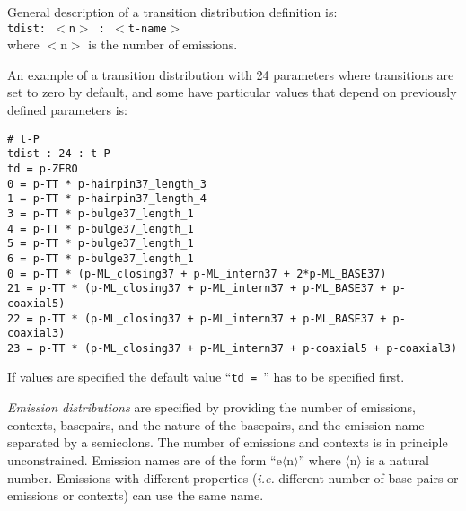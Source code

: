 \noindent
General description of a transition distribution  definition is:\\

\noindent
\texttt{tdist: $<$n$>$ : $<$t-name$>$}\\

\noindent
where $<$n$>$ is the number of emissions.

\noindent
An example of a transition distribution with 24 parameters where
transitions are set to zero by default, and some have particular
values that depend on previously defined parameters is:\\

\noindent
\begin{footnotesize}
\texttt{\# t-P}\\
\texttt{tdist : 24 : t-P}\\
\texttt{td = p-ZERO}\\
\texttt{0  = p-TT * p-hairpin37\_length\_3}\\
\texttt{1  = p-TT * p-hairpin37\_length\_4 }\\ 
\texttt{3  = p-TT * p-bulge37\_length\_1}\\
\texttt{4  = p-TT * p-bulge37\_length\_1}\\
\texttt{5  = p-TT * p-bulge37\_length\_1}\\
\texttt{6  = p-TT * p-bulge37\_length\_1}\\
\texttt{0 = p-TT * (p-ML\_closing37 + p-ML\_intern37 + 2*p-ML\_BASE37)}\\
\texttt{21 = p-TT * (p-ML\_closing37 + p-ML\_intern37 +   p-ML\_BASE37 + p-coaxial5)}\\
\texttt{22 = p-TT * (p-ML\_closing37 + p-ML\_intern37 +   p-ML\_BASE37 + p-coaxial3)}\\
\texttt{23 = p-TT * (p-ML\_closing37 + p-ML\_intern37                 + p-coaxial5 + p-coaxial3)}\\
\end{footnotesize}

\noindent
If values are specified the default value ``\texttt{td = }'' has to be specified first.

 \textsl{Emission distributions} are specified by providing the
number of emissions, contexts, basepairs, and the nature of the
basepairs, and the emission name separated by a semicolons.  The
number of emissions and contexts is in principle unconstrained.
Emission names are of the form ``e$\langle$n$\rangle$'' where
$\langle$n$\rangle$ is a natural number.  Emissions with different
properties (\textsl{i.e.}  different number of base pairs or emissions
or contexts) can use the same name.\\

